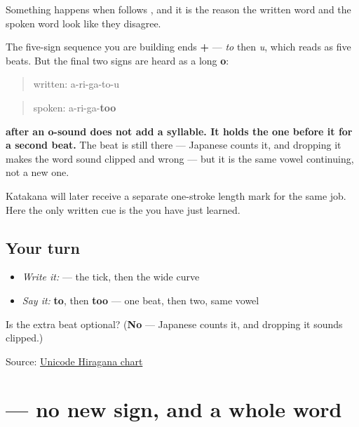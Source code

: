 \begin{grammarlens}[title={What you've built — and what this sign does after \ja{と}}]
Something happens when  follows , and it is the reason the written word and the spoken word look like they disagree.

The five-sign sequence you are building ends \textbf{ + } — \emph{to} then \emph{u}, which reads as five beats. But the final two signs are heard as a long \textbf{o}:

\begin{quote}
written: a-ri-ga-to-u
\end{quote}

\begin{quote}
spoken: a-ri-ga-\textbf{too}
\end{quote}

\textbf{ after an o-sound does not add a syllable. It holds the one before it for a second beat.} The beat is still there — Japanese counts it, and dropping it makes the word sound clipped and wrong — but it is the same vowel continuing, not a new one.

Katakana will later receive a separate one-stroke length mark for the same job. Here the only written cue is the \textbf{} you have just learned.
\end{grammarlens}

\subsection*{Your turn}
\begin{itemize}
\raggedright
  \item \emph{Write it:}  — the tick, then the wide curve
  \item \emph{Say it:} \textbf{to}, then \textbf{too} — one beat, then two, same vowel
\end{itemize}

\begin{tcolorbox}[breakable,colback=teal!4,colframe=teal!35!black,title={Before you move on}]
Is the extra beat optional? (\textbf{No} — Japanese counts it, and dropping it sounds clipped.)

Source: \href{https://www.unicode.org/charts/PDF/U3040.pdf}{Unicode Hiragana chart}
\end{tcolorbox}
\section[\texorpdfstring{\ja{ありがとう} (arigatou)}{ありがとう (arigatou)}]{ — no new sign, and a whole word}

